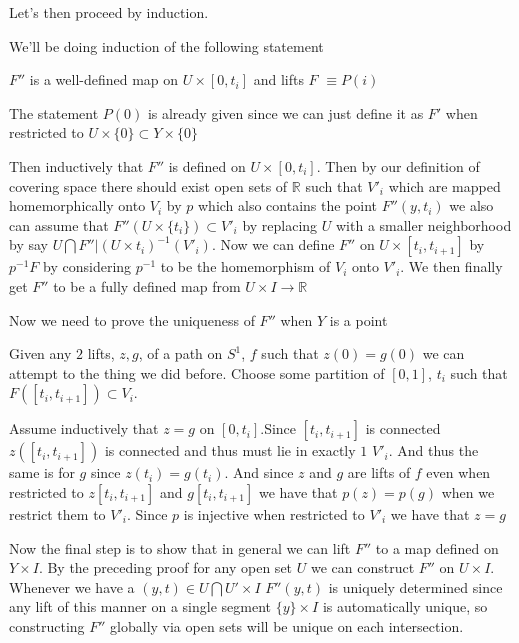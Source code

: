 \documentclass[paper=a4,fontsize=paper,12.5pt]{book}
\newcommand{\3}{\vspace*{3mm}}
\newcommand{\R}{\mathbb{R}}
\newcommand{\C}[1]{{S}^{#1}}
\begin{document}
\3

Let's then proceed by induction. 

\3

We'll be doing induction of the following statement

\3

$F''$ is a well-defined map on $U \times [0,{t}_{i}]$ and lifts $F$  $\equiv P(i)$

\3

The statement $P(0)$ is already given since we can just define it as $F'$ when restricted to $U \times \{0\} \subset Y \times \{0\} $

\3

Then inductively that $F''$ is defined on $U \times [0,{t}_{i}]$. Then by our definition of covering space there should exist open sets of $\R$ such that ${V'}_{i}$ which are mapped homemorphically onto ${V}_{i}$ by $p$ which also contains the point $F''(y,{t}_{i})$ we also can assume that $F''( U \times \{{t}_{i} \}) \subset {V'}_{i}$ by replacing $U$ with a smaller neighborhood by say $U \bigcap {F'' |(U \times {{t}_{i}})}^{-1}({V'}_{i})$. Now we can define $F''$ on $U \times [{t}_{i}, {t}_{i+1}]$ by ${p}^{-1}F$ by considering ${p}^{-1}$ to be the homemorphism of ${V}_{i}$ onto ${V'}_{i}$. We then finally get $F''$ to be a fully defined map from $U \times I \to \R$

\3

Now we need to prove the uniqueness of $F''$ when $Y$ is a point
\3

Given any $2$ lifts, $z,g$, of a path on $\C{1}$, $f$ such that $z(0) = g(0)$ we can attempt to the thing we did before. Choose some partition of $[0,1]$, ${t}_{i}$ such that $F([{t}_{i},{t}_{i+1}]) \subset {V}_{i}$. 

\3

Assume inductively that $z =g$ on $[0,{t}_{i}]$.Since $[{t}_{i},{t}_{i+1}]$ is connected $z([{t}_{i},{t}_{i+1}])$ is connected and thus must lie in exactly $1$ ${V'}_{i}$. And thus the same is for $g$ since $z({t}_{i}) = g({t}_{i})$. And since $z$ and $g$ are lifts of $f$ even when restricted to $z[{t}_{i},{t}_{i+1}] $ and $g[{t}_{i},{t}_{i+1}]$ we have that $p(z) = p(g)$ when we restrict them to ${V'}_{i}$. Since $p$ is injective when restricted to ${V'}_{i}$ we have that $z = g$ 

\3

Now the final step is to show that in general we can lift $F''$ to a map defined on $Y \times I$. By the preceding proof for any open set $U$ we can construct $F''$ on $U \times I$. Whenever we have a $(y,t) \in U \bigcap U' \times I$ $F''(y,t)$ is uniquely determined since any lift of this manner on a single segment $\{y\} \times I$ is automatically unique, so constructing $F''$ globally via open sets will be unique on each intersection.
\end{document}
